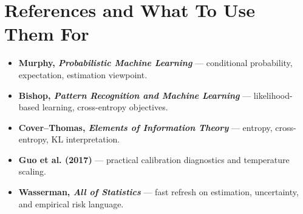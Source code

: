 \section*{References and What To Use Them For}
\begin{itemize}[leftmargin=1.5em]
  \item \textbf{Murphy, \emph{Probabilistic Machine Learning}} --- conditional probability, expectation, estimation viewpoint.
  \item \textbf{Bishop, \emph{Pattern Recognition and Machine Learning}} --- likelihood-based learning, cross-entropy objectives.
  \item \textbf{Cover--Thomas, \emph{Elements of Information Theory}} --- entropy, cross-entropy, KL interpretation.
  \item \textbf{Guo et al. (2017)} --- practical calibration diagnostics and temperature scaling.
  \item \textbf{Wasserman, \emph{All of Statistics}} --- fast refresh on estimation, uncertainty, and empirical risk language.
\end{itemize}
